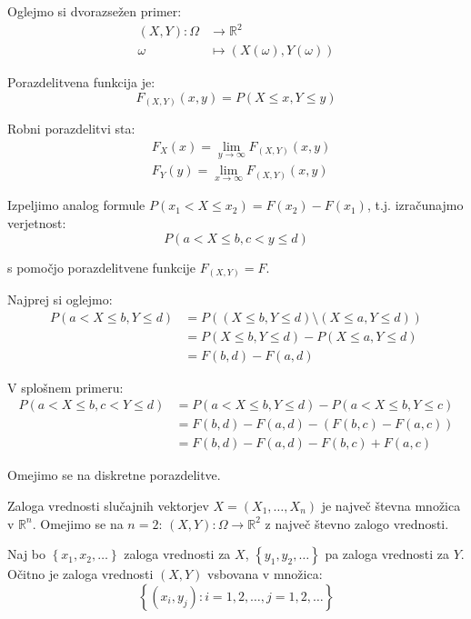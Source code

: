 \documentclass[12pt]{book}
\def\n{\noindent}
\def\s{\vspace{10pt}}
\theoremstyle{definition}
\theoremstyle{plain}
\theoremstyle{plain}
\theoremstyle{plain}
\theoremstyle{remark}
\begin{document}
\n Oglejmo si dvorazsežen primer:
$$
\begin{aligned}
    (X, Y): \Omega & \to \mathbb{R}^2 \\
    \omega & \mapsto(X(\omega), Y(\omega))
    \end{aligned}
$$

Porazdelitvena funkcija je: 
$$
F_{(X, Y)}(x, y)=P(X \leq x, Y \leq y)
$$

Robni porazdelitvi sta: 
$$
\begin{aligned}
    &F_X(x)=\lim _{y \rightarrow \infty} F_{(X, Y)}{(x, y)} \\
    &F_Y(y)=\lim _{x \rightarrow \infty} F_{(X,Y)}(x, y)
\end{aligned}
$$

\s

\n Izpeljimo analog formule $P\left(x_1<X \leq x_2\right)=F\left(x_2\right)-F\left(x_1\right)$, t.j. izračunajmo verjetnost:
$$
P(a<X \leq b, c<y \leq d)
$$

s pomočjo porazdelitvene funkcije $F_{(X, Y)}=F$.

\n Najprej si oglejmo:
$$
\begin{aligned}
    P(a<X \leq b, Y \leq d)&=P\left((X \leq b, Y \leq d) \setminus (X \leq a, Y \leq d)\right) \\
    &=P(X \leq b, Y \leq d)-P(X \leq a, Y \leq d) \\
    &=F(b, d)-F(a, d)
\end{aligned}
$$

\n V splošnem primeru: 
$$
\begin{aligned}
    P(a<X \leq b, c<Y \leq d)&=P(a<X \leq b, Y \leq d) - P(a<X \leq b, Y \leq c) \\
    &=F(b, d)-F(a, d) - (F(b, c)-F(a, c)) \\
    &=F(b, d)-F(a, d)-F(b, c)+F(a, c)
\end{aligned}
$$

\n Omejimo se na diskretne porazdelitve. 

Zaloga vrednosti slučajnih vektorjev $X=\left(X_1, \ldots, X_n\right)$ je največ števna množica v $\mathbb{R}^n$. Omejimo se na $n=2$: $(X, Y): \Omega \to \mathbb{R}^2$ z največ števno zalogo vrednosti. 

Naj bo $\left\{x_1, x_2, \ldots\right\}$ zaloga vrednosti za $X$, $\left\{y_1, y_2, \ldots\right\}$ pa zaloga vrednosti za $Y$. Očitno je zaloga vrednosti $(X,Y)$ vsbovana v množica:
$$
\left\{\left(x_i, y_j\right): i=1,2, \ldots, j=1,2, \ldots\right\}
$$
\end{document}
